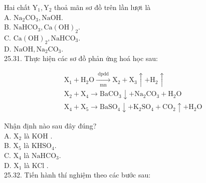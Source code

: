 \documentclass[10pt]{article}
\begin{document}
Hai chất $\mathrm{Y}_{1}, \mathrm{Y}_{2}$ thoả mãn sơ đồ trên lần lượt là\\
A. $\mathrm{Na}_{2} \mathrm{CO}_{3}, \mathrm{NaOH}$.\\
B. $\mathrm{NaHCO}_{3}, \mathrm{Ca}(\mathrm{OH})_{2}$.\\
C. $\mathrm{Ca}(\mathrm{OH})_{2}, \mathrm{NaHCO}_{3}$.\\
D. $\mathrm{NaOH}, \mathrm{Na}_{2} \mathrm{CO}_{3}$.\\
25.31. Thực hiện các sơ đồ phản ứng hoá học sau:

$$
\begin{aligned}
& \mathrm{X}_{1}+\mathrm{H}_{2} \mathrm{O} \xrightarrow[\mathrm{mn}]{\text { dpdd }} \mathrm{X}_{2}+\mathrm{X}_{3} \uparrow+\mathrm{H}_{2} \uparrow \\
& \mathrm{X}_{2}+\mathrm{X}_{4} \longrightarrow \mathrm{BaCO}_{3} \downarrow+\mathrm{Na}_{2} \mathrm{CO}_{3}+\mathrm{H}_{2} \mathrm{O} \\
& \mathrm{X}_{4}+\mathrm{X}_{5} \longrightarrow \mathrm{BaSO}_{4} \downarrow+\mathrm{K}_{2} \mathrm{SO}_{4}+\mathrm{CO}_{2} \uparrow+\mathrm{H}_{2} \mathrm{O}
\end{aligned}
$$

Nhận định nào sau đây đúng?\\
A. $\mathrm{X}_{2}$ là KOH .\\
B. $\mathrm{X}_{5}$ là $\mathrm{KHSO}_{4}$.\\
C. $\mathrm{X}_{4}$ là $\mathrm{NaHCO}_{3}$.\\
D. $\mathrm{X}_{1}$ là KCl .\\
25.32. Tiến hành thí nghiệm theo các bước sau:
\end{document}
